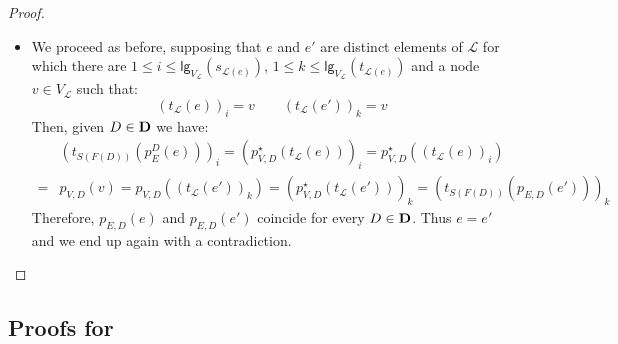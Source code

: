 \documentclass[3p]{elsarticle}
\newcommand{\lgh}{\mathsf{lg}}
\def\D{\textbf {\textup{D}}}
\theoremstyle{remark}
\theoremstyle{definition}
\begin{document}
\begin{proof}
\begin{itemize}
		\item  We proceed as before, supposing that $e$ and $e'$ are distinct elements of $\mathcal{L}$ for which there are $1\leq i \leq \lgh_{V_{\mathcal{L}}}(s_{\mathcal{L}(e)})$, $1\leq k \leq \lgh_{V_{\mathcal{L}}}(t_{\mathcal{L}(e)}) $ and a node $v\in V_{\mathcal{L}}$ such that:
				\[(t_{\mathcal{L}}(e))_i=v \qquad  (t_{\mathcal{L}}(e') )_k= v\]
		Then, given $D\in \D$ we have:
		\begin{align*}&(t_{S(F(D))}( p^D_{E}(e)))_i = ( p^\star_{V,D}(t_{\mathcal{L}}(e)))_i=p^\star_{V, D}((t_{\mathcal{L}}(e))_i)\\=&p_{V,D}(v)=p_{V, D}((t_{\mathcal{L}}(e'))_k)=(p^\star_{V,D}(t_{\mathcal{L}}(e')))_k=(t_{S(F(D))}( p_{E,D}(e')))_k  	
		\end{align*}
		Therefore,  $p_{E,D}(e)$ and $p_{E,D}(e')$ coincide for every $D\in \D$. Thus  $e = e'$ and we end up again with a contradiction. \qedhere 
	\end{itemize}
\end{proof}




\subsection{Proofs for }\label{app:due}
\fhyp*
\end{document}
